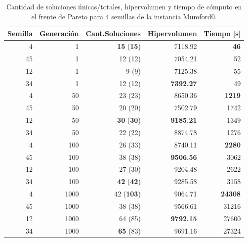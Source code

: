 \begin{table}[!htb]
\centering
\begin{tabular}{|r|r|r|r|r|}
\hline
Semilla & Generación & Cant.Soluciones & Hipervolumen & Tiempo [s]\\ 
\hline \hline
4 & 1 & \textbf{15} (\textbf{15}) & 7118.92 & \textbf{46} \\ \hline
45 & 1 & 12 (12) & 7054.21 & 52 \\ \hline
12 & 1 & 9 (9) & 7125.38 & 55 \\ \hline
34 & 1 & 12 (12) & \textbf{7392.27} & 49 \\ \hline\hline
4 & 50 & 23 (23) & 8650.36 & \textbf{1219} \\ \hline
45 & 50 & 20 (20) & 7502.79 & 1742 \\ \hline
12 & 50 & \textbf{30} (\textbf{30}) & \textbf{9185.21} & 1349 \\ \hline
34 & 50 & 22 (22) & 8874.78 & 1276 \\ \hline\hline
4 & 100 & 26 (33) & 8740.11 & \textbf{2280} \\ \hline
45 & 100 & 38 (38) & \textbf{9506.56} & 3062 \\ \hline
12 & 100 & 27 (30) & 9204.48 & 2622 \\ \hline
34 & 100 & \textbf{42} (\textbf{42}) & 9285.58 & 3158 \\ \hline\hline
4 & 1000 & 42 (\textbf{103}) & 9064.71 & \textbf{24308} \\ \hline
45 & 1000 & 38 (38) & 9566.61 & 31216 \\ \hline
12 & 1000 & 64 (85) & \textbf{9792.15} & 27600 \\ \hline
34 & 1000 & \textbf{65} (83) & 9691.16 & 27324 \\ \hline\hline
\end{tabular}
\caption{Cantidad de soluciones únicas/totales, hipervolumen y tiempo de cómputo en el frente de Pareto para 4 semillas de la instancia Mumford0.}
\label{tab:dataFrenteMumford0}
\end{table}

